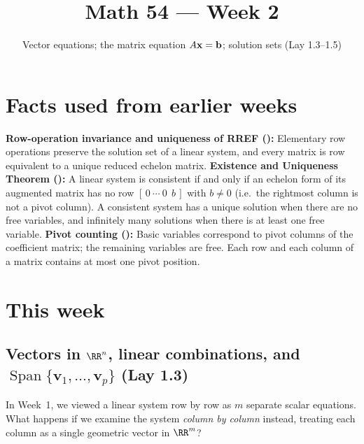 \documentclass[10pt]{scrartcl}
\title{Math 54 --- Week 2}
\subtitle{Vector equations; the matrix equation $A\vv x=\vv b$; solution sets (Lay 1.3--1.5)}
\author{}\date{}\ihead{}
\newcommand{\vv}[1]{\mathbf{#1}}
\DeclareMathOperator{\spn}{Span}
\begin{document}
\maketitle

\section{Facts used from earlier weeks}
\begin{enumerate}[label=(W\arabic*),leftmargin=2.8em,itemsep=4pt]
  \ii {}\textbf{Row-operation invariance and uniqueness of RREF ():} Elementary row operations preserve the solution set of a linear system, and every matrix is row equivalent to a unique reduced echelon matrix.
  \ii {}\textbf{Existence and Uniqueness Theorem ():} A linear system is consistent if and only if an echelon form of its augmented matrix has no row $[\,0\ \cdots\ 0\ \ b\,]$ with $b\ne0$ (i.e.\ the rightmost column is not a pivot column). A consistent system has a unique solution when there are no free variables, and infinitely many solutions when there is at least one free variable.
  \ii {}\textbf{Pivot counting ():} Basic variables correspond to pivot columns of the coefficient matrix; the remaining variables are free. Each row and each column of a matrix contains at most one pivot position.
\end{enumerate}

\section{This week}

\subsection{Vectors in $\RR^n$, linear combinations, and $\spn\{\vv v_1,\dots,\vv v_p\}$ (Lay 1.3)}

\begin{qbox}
  In Week~1, we viewed a linear system row by row as $m$ separate scalar equations. What happens if we examine the system \emph{column by column} instead, treating each column as a single geometric vector in $\RR^m$?
\end{qbox}
\end{document}
